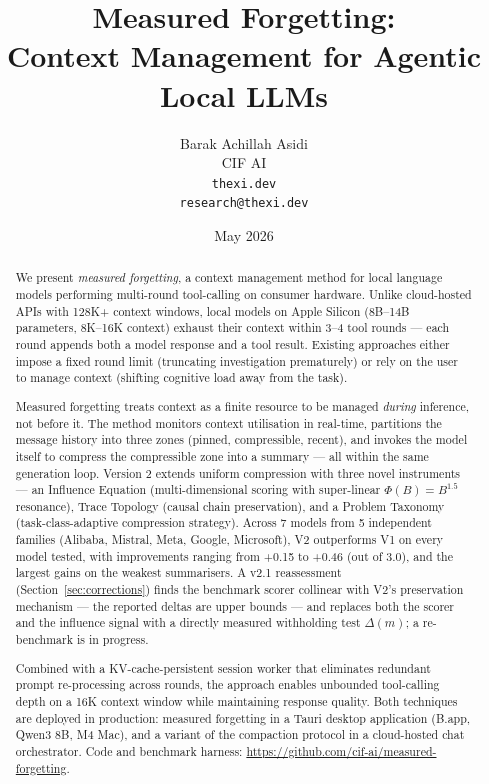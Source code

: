 \documentclass[11pt,a4paper]{article}
\title{%
  \textbf{Measured Forgetting:}\\[0.3em]
  \Large Context Management for Agentic Local LLMs%
}
\author{%
  Barak Achillah Asidi\\
  CIF AI\\
  \texttt{thexi.dev}\\
  \texttt{research@thexi.dev}%
}
\date{May 2026}
\begin{document}
\maketitle

\begin{abstract}
We present \emph{measured forgetting}, a context management method for local language models performing multi-round tool-calling on consumer hardware. Unlike cloud-hosted APIs with 128K+ context windows, local models on Apple Silicon (8B--14B parameters, 8K--16K context) exhaust their context within 3--4 tool rounds --- each round appends both a model response and a tool result. Existing approaches either impose a fixed round limit (truncating investigation prematurely) or rely on the user to manage context (shifting cognitive load away from the task).

Measured forgetting treats context as a finite resource to be managed \emph{during} inference, not before it. The method monitors context utilisation in real-time, partitions the message history into three zones (pinned, compressible, recent), and invokes the model itself to compress the compressible zone into a summary --- all within the same generation loop. Version 2 extends uniform compression with three novel instruments --- an Influence Equation (multi-dimensional scoring with super-linear $\Phi(B) = B^{1.5}$ resonance), Trace Topology (causal chain preservation), and a Problem Taxonomy (task-class-adaptive compression strategy). Across 7 models from 5 independent families (Alibaba, Mistral, Meta, Google, Microsoft), V2 outperforms V1 on every model tested, with improvements ranging from +0.15 to +0.46 (out of 3.0), and the largest gains on the weakest summarisers. A v2.1 reassessment (Section~\ref{sec:corrections}) finds the benchmark scorer collinear with V2's preservation mechanism --- the reported deltas are upper bounds --- and replaces both the scorer and the influence signal with a directly measured withholding test $\Delta(m)$; a re-benchmark is in progress.

Combined with a KV-cache-persistent session worker that eliminates redundant prompt re-processing across rounds, the approach enables unbounded tool-calling depth on a 16K context window while maintaining response quality. Both techniques are deployed in production: measured forgetting in a Tauri desktop application (B.app, Qwen3 8B, M4 Mac), and a variant of the compaction protocol in a cloud-hosted chat orchestrator. Code and benchmark harness: \url{https://github.com/cif-ai/measured-forgetting}.
\end{abstract}
\end{document}
